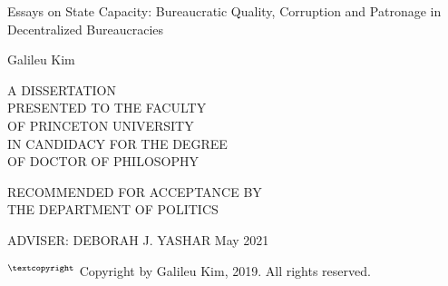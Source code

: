 \documentclass[12pt]{report}
\theoremstyle{definition}
\begin{document}
\begin{titlepage}
    \begin{center}
        \vspace*{6cm}
        
        \huge
        Essays on State Capacity: Bureaucratic Quality, Corruption and Patronage in Decentralized Bureaucracies
 
             
        \vspace{1.5cm}
        
        \LARGE
        Galileu Kim
 
        \vspace{3cm}
                
        \normalsize
        A DISSERTATION\\
        PRESENTED TO THE FACULTY\\
        OF PRINCETON UNIVERSITY\\
        IN CANDIDACY FOR THE DEGREE\\
        OF DOCTOR OF PHILOSOPHY
        
        \vspace{1cm}
        
        RECOMMENDED FOR ACCEPTANCE BY\\
        THE DEPARTMENT OF POLITICS

        \vspace{1cm}

        ADVISER: DEBORAH J. YASHAR
        \vfill
        \Large
        May 2021
    \end{center}
\end{titlepage}

\newpage


\newpage


\begin{center}
    \thispagestyle{empty}
    $^{\textcopyright}$ Copyright by Galileu Kim, 2019. All rights reserved.
\end{center}
\end{document}
